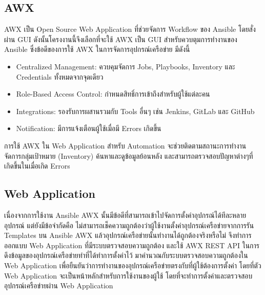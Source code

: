 \subsection{AWX}
\hspace{0.5in} AWX เป็น Open Source Web Application ที่ช่วยจัดการ Workflow ของ Ansible โดยสั่งผ่าน GUI ดังนั้นโครงงานนี้จึงเลือกที่จะใช้ AWX เป็น GUI สำหรับควบตุมการทำงานของ Ansible ซึ่งข้อดีของการใช้ AWX ในการจัดการอุปกรณ์เครือข่าย มีดังนี้
\begin{itemize}
  \item Centralized Management: ควบคุมจัดการ Jobs, Playbooks, Inventory และ Credentials ทั้งหมดจากจุดเดียว
  \item Role-Based Access Control: กำหนดสิทธิ์การเข้าถึงสำหรับผู้ใช้แต่ละคน
  \item Integrations: รองรับการผสานรวมกับ Tools อื่นๆ เช่น Jenkins, GitLab และ GitHub
  \item Notification: มีการแจ้งเตือนผู้ใช้เมื่อมี Errors เกิดขึ้น
\end{itemize}
\hspace{0.5in} การใช้ AWX ใน Web Application สำหรับ Automation จะช่วยติดตามสถานะการทำงาน จัดการกลุ่มเป้าหมาย (Inventory) ค้นหาและดูข้อมูลย้อนหลัง และสามารถตรวจสอบปัญหาต่างๆที่เกิดขึ้นในเมื่อเกิด Errors

\subsection{Web Application}
\hspace{0.5in} เนื่องจากการใช้งาน Ansible AWX นั้นมีข้อดีที่สามารถเข้าไปจัดการตั้งค่าอุปกรณ์ได้ทีละหลายอุปกรณ์ แต่ยังมีข้อจำกัดคือ ไม่สามารถเช็คความถูกต้องว่าผู้ใช้งานตั้งค่าอุปกรณ์เครือข่ายจากการรัน Templates บน Ansible AWX แล้วอุปกรณ์เครือข่ายนั้นทำงานได้ถูกต้องจริงหรือไม่ จึงทำการออกแบบ Web Application ที่มีระบบตรวจสอบความถูกต้อง และใช้ AWX REST API ในการดึงข้อมูลของอุปกรณ์เครือข่ายทำที่ได้ทำการตั้งค่าไว้ มาคำนวณกับระบบตรวจสอบความถูกต้องใน Web Application เพื่อยืนยันว่าการทำงานของอุปกรณ์เครือข่ายตรงกับที่ผู้ใช้ต้องการตั้งค่า โดยที่ตัว Web Application จะเป็นหน้าหลักสำหรับการใช้งานของผู้ใช้ โดยที่จะทำการตั้งค่าและตรวจสอบอุปกรณ์เครือข่ายผ่าน Web Application
